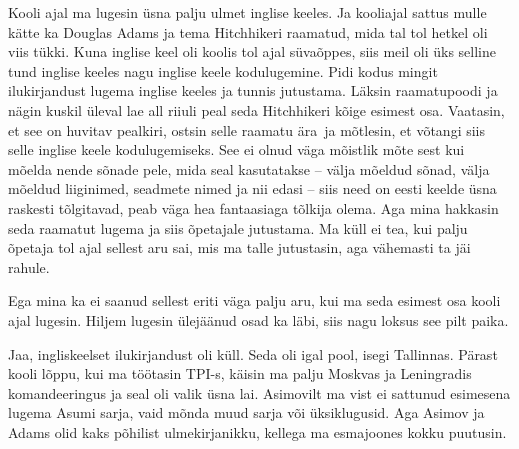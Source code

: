 Kooli ajal ma lugesin üsna palju ulmet inglise keeles. Ja kooliajal sattus 
mulle kätte ka Douglas Adams ja tema Hitchhikeri raamatud, mida tal tol hetkel oli viis 
tükki. Kuna inglise keel oli koolis tol ajal süvaõppes, siis meil oli üks 
selline tund inglise keeles nagu inglise keele kodulugemine. Pidi kodus mingit 
ilukirjandust lugema inglise keeles ja tunnis  jutustama. Läksin raamatupoodi 
ja nägin kuskil üleval lae all riiuli peal seda Hitchhikeri kõige esimest osa. 
Vaatasin, et see on huvitav pealkiri, ostsin selle raamatu ära ja mõtlesin, et 
võtangi siis selle inglise keele kodulugemiseks. See ei olnud väga mõistlik 
mõte sest kui mõelda nende sõnade pele, mida seal kasutatakse -- välja mõeldud 
sõnad, välja mõeldud liiginimed, seadmete nimed ja nii edasi -- siis need on 
eesti keelde üsna raskesti tõlgitavad,  peab väga hea fantaasiaga tõlkija 
olema. Aga mina hakkasin seda raamatut lugema ja siis õpetajale jutustama. Ma 
küll ei tea, kui palju õpetaja tol ajal sellest aru sai, mis ma talle 
jutustasin, aga vähemasti ta jäi rahule. 


Ega mina ka ei saanud  sellest eriti väga palju aru, kui ma seda esimest osa 
kooli ajal lugesin. Hiljem lugesin  ülejäänud osad ka läbi, siis nagu loksus 
see pilt paika.


Jaa, ingliskeelset ilukirjandust oli küll. Seda oli igal pool, isegi Tallinnas. 
Pärast kooli lõppu, kui ma töötasin TPI-s, 
käisin ma palju Moskvas ja Leningradis komandeeringus ja seal oli valik üsna 
lai. Asimovilt ma vist ei sattunud esimesena lugema Asumi sarja, vaid mõnda muud sarja või 
üksiklugusid. Aga Asimov ja Adams olid kaks põhilist ulmekirjanikku, 
kellega ma esmajoones kokku puutusin. 


